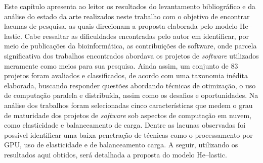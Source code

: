 \documentclass[english,brazilian]{UNISINOSmonografia} %
\begin{document}
Este capítulo apresenta ao leitor os resultados do levantamento bibliográfico e da análise do estado da arte realizados neste trabalho com o objetivo de encontrar lacunas de pesquisa, as quais direcionam a proposta elaborada pelo modelo \textsf{He}--lastic.
Cabe ressaltar as dificuldades encontradas pelo autor em identificar, por meio de publicações da bioinformática, as contribuições de software, onde parcela significativa dos trabalhos encontrados abordava os projetos de \textit{software} utilizados meramente como meios para sua pesquisa.
Ainda assim, um conjunto de 83 projetos foram avaliados e classificados, de acordo com uma taxonomia inédita elaborada, buscando responder questões abordando técnicas de otimização, o uso de computação paralela e distribuída, assim como os desafios e oportunidades.
Na análise dos trabalhos foram selecionadas cinco características que medem o grau de maturidade dos projetos de \textit{software} sob aspectos de computação em nuvem, como elasticidade e balanceamento de carga.
Dentre as lacunas observadas foi possível identificar uma baixa penetração de técnicas como o processamento por GPU, uso de elasticidade e de balanceamento carga.
A seguir, utilizando os resultados aqui obtidos, será detalhada a proposta do modelo \textsf{He}--lastic.
\end{document}
